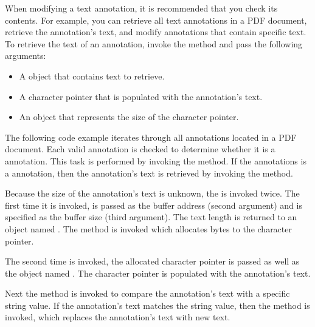 \documentclass[letterpaper,12pt,english,openany,oneside]{sphinxmanual}
\begin{document}
When modifying a text annotation, it is recommended that you check its contents. For example, you can retrieve all text annotations in a PDF document, retrieve the annotation’s text, and modify annotations that contain specific text. To retrieve the text of an annotation, invoke the  method and pass the following arguments:
\begin{itemize}
\item {} 
A  object that contains text to retrieve.

\item {} 
A character pointer that is populated with the annotation’s text.

\item {} 
An  object that represents the size of the character pointer.

\end{itemize}

The following code example iterates through all annotations located in a PDF document. Each valid annotation is checked to determine whether it is a  annotation. This task is performed by invoking the  method. If the annotations is a  annotation, then the annotation’s text is retrieved by invoking the  method.

Because the size of the annotation’s text is unknown, the  is invoked twice. The first time it is invoked,  is passed as the buffer address (second argument) and  is specified as the buffer size (third argument). The text length is returned to an  object named . The  method is invoked which allocates  bytes to the character pointer.

The second time  is invoked, the allocated character pointer is passed as well as the  object named . The character pointer is populated with the annotation’s text.

Next the  method is invoked to compare the annotation’s text with a specific string value. If the annotation’s text matches the string value, then the  method is invoked, which replaces the annotation’s text with new text.
\end{document}
